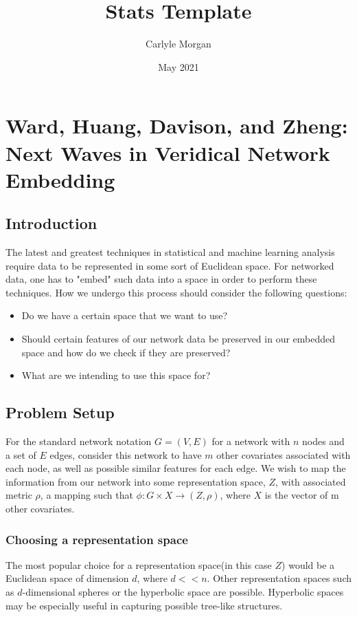 \documentclass{article}
\title{Stats Template}
\author{Carlyle Morgan}
\date{May 2021}
\begin{document}
\section{Ward, Huang, Davison, and Zheng: Next Waves in Veridical Network Embedding}

\subsection{Introduction}

The latest and greatest techniques in statistical and machine learning analysis require data to be represented in some sort of Euclidean space. For networked data, one has to "embed" such data into a space in order to perform these techniques. How we undergo this process should consider the following questions:
\begin{itemize}
\item  Do we have a certain space that we want to use?
\item  Should certain features of our network data be preserved in our embedded space and how do we check if they are preserved?
\item What are we intending to use this space for?
\end{itemize}

\subsection{Problem Setup}
For the standard network notation $G = (V,E)$ for a network with $n$ nodes and a set of $E$ edges, consider this network to have $m$ other covariates associated with each node, as well as possible similar features for each edge. We wish to map the information from our network into some representation space, $Z$, with associated metric $\rho$, a mapping such that $\phi : G \times X \to (Z, \rho)$, where $X$ is the vector of m other covariates.

\subsubsection{Choosing a representation space}

The most popular choice for a representation space(in this case $Z$) would be a Euclidean space of dimension $d$, where $d<<n$. Other representation spaces such as $d$-dimensional spheres or the hyperbolic space are possible. Hyperbolic spaces may be especially useful in capturing possible tree-like structures. 
\end{document}
